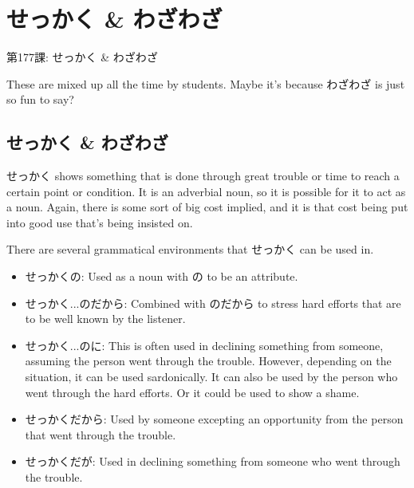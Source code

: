     
\chapter{せっかく \& わざわざ}

\begin{center}
\begin{Large}
第177課: せっかく \& わざわざ 
\end{Large}
\end{center}
 
\par{ These are mixed up all the time by students. Maybe it's because わざわざ is just so fun to say? }
      
\section{せっかく \& わざわざ}
 
\par{ せっかく shows something that is done through great trouble or time to reach a certain point or condition. It is an adverbial noun, so it is possible for it to act as a noun. Again, there is some sort of big cost implied, and it is that cost being put into good use that's being insisted on. }

\par{ There are several grammatical environments that せっかく can be used in. }

\begin{itemize}

\item せっかくの: Used as a noun with の to be an attribute. 
\item せっかく\dothyp{}\dothyp{}\dothyp{}のだから: Combined with のだから to stress hard efforts that are to be well known by the listener. 
\item せっかく\dothyp{}\dothyp{}\dothyp{}のに: This is often used in declining something from someone, assuming the person went through the trouble. However, depending on the situation, it can be used sardonically. It can also be used by the person who went through the hard efforts. Or it could be used to show a shame. 
\item せっかくだから: Used by someone excepting an opportunity from the person that went through the trouble. 
\item せっかくだが: Used in declining something from someone who went through the trouble. 
\end{itemize}


